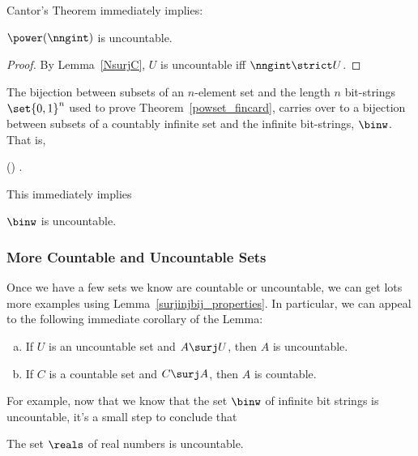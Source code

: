 Cantor's Theorem immediately implies:
\begin{corollary}
$\power(\nngint)$ is uncountable.
\end{corollary}

\begin{proof}
By Lemma~\ref{NsurjC}, $U$ is uncountable iff $\nngint \strict U$.
\end{proof}

The bijection between subsets of an $n$-element set and the length $n$
bit-strings $\set{0,1}^n$ used to prove
Theorem~\ref{powset_fincard}, carries over to a bijection between
subsets of a countably infinite set and the infinite bit-strings,
$\binw$.  That is,
\begin{lemma}\label{pownnegbijbinw}
\power(\nngint) \bij \binw.
\end{lemma}
This immediately implies
\begin{corollary}
$\binw$ is uncountable.
\end{corollary}

\subsubsection{More Countable and Uncountable Sets}

Once we have a few sets we know are countable or uncountable, we can
get lots more examples using Lemma~\ref{surjinjbij_properties}.  In particular, 
we can appeal to the following immediate corollary of the Lemma:
\noindent \begin{corollary}\label{UinjAu}
\mbox{}
\begin{enumerate}[(a)]

\item\label{AsurjUA}
If $U$ is an uncountable set and $A \surj U$, then $A$ is uncountable.

\item\label{CsurjAc}
If $C$ is a countable set and $C \surj A$, then $A$ is countable.
\end{enumerate}
\end{corollary}

For example, now that we know that the set $\binw$ of infinite bit
strings is uncountable, it's a small step to conclude that
\begin{corollary}\label{uncountR}
The set $\reals$ of real numbers is uncountable.
\end{corollary}


